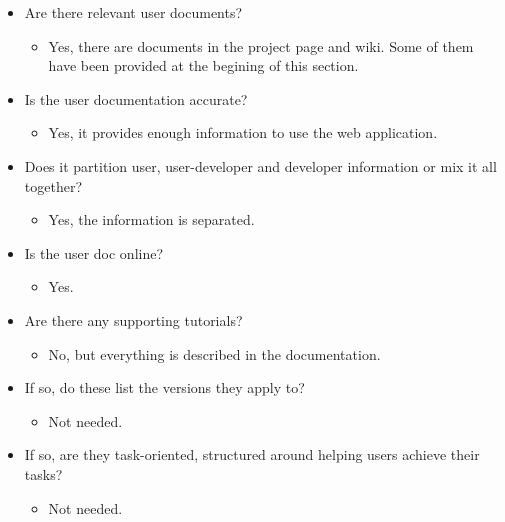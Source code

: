 \begin{itemize}
\itemsep1pt\parskip0pt
\item
  Are there relevant user documents?

  \begin{itemize}
  \itemsep1pt\parskip0pt
  \item
    Yes, there are documents in the project page and wiki. Some of them
    have been provided at the begining of this section.
  \end{itemize}
\item
  Is the user documentation accurate?

  \begin{itemize}
  \itemsep1pt\parskip0pt
  \item
    Yes, it provides enough information to use the web application.
  \end{itemize}
\item
  Does it partition user, user-developer and developer information or
  mix it all together?

  \begin{itemize}
  \itemsep1pt\parskip0pt
  \item
    Yes, the information is separated.
  \end{itemize}
\item
  Is the user doc online?

  \begin{itemize}
  \itemsep1pt\parskip0pt
  \item
    Yes.
  \end{itemize}
\item
  Are there any supporting tutorials?

  \begin{itemize}
  \itemsep1pt\parskip0pt
  \item
    No, but everything is described in the documentation.
  \end{itemize}
\item
  If so, do these list the versions they apply to?

  \begin{itemize}
  \itemsep1pt\parskip0pt
  \item
    Not needed.
  \end{itemize}
\item
  If so, are they task-oriented, structured around helping users achieve
  their tasks?

  \begin{itemize}
  \itemsep1pt\parskip0pt
  \item
    Not needed.
  \end{itemize}
\end{itemize}


